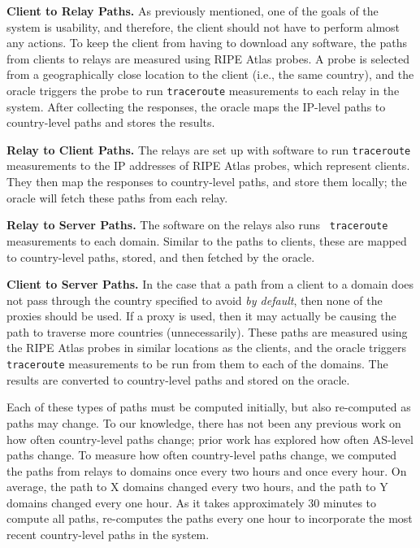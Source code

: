 {\bf Client to Relay Paths.} As previously mentioned, one of the goals of the 
system is usability, and therefore, the client should not have to perform 
almost any actions.  To keep the client from having to download any software, 
the paths from clients to relays are measured using RIPE Atlas probes.  A probe 
is selected from a geographically close location to the client (i.e., the same 
country), and the oracle triggers the probe to run {\tt traceroute} measurements 
to each relay in the system.  After collecting the responses, the oracle maps 
the IP-level paths to country-level paths and stores the results.

{\bf Relay to Client Paths.} The relays are set up with software to run 
{\tt traceroute} measurements to the IP addresses of RIPE Atlas probes, which 
represent clients.  They then map the responses to country-level paths, and 
store them locally; the oracle will fetch these paths from each relay. 

{\bf Relay to Server Paths.} The software on the relays also runs {\tt 
traceroute} measurements to each domain.  Similar to the paths to clients, these 
are mapped to country-level paths, stored, and then fetched by the oracle.

{\bf Client to Server Paths.} In the case that a path from a client to a 
domain does not pass through the country specified to avoid {\it by default}, 
then none of the proxies should be used.  If a proxy is used, then it may 
actually be causing the path to traverse more countries (unnecessarily).  These 
paths are measured using the RIPE Atlas probes in similar locations as the 
clients, and the oracle triggers {\tt traceroute} measurements to be run from 
them to each of the domains.  The results are converted to country-level paths 
and stored on the oracle.  

Each of these types of paths must be computed initially, but also re-computed 
as paths may change.  To our knowledge, there has not been any previous work 
on how often country-level paths change; prior work has explored how often 
AS-level paths change.  To measure how often country-level paths change, we 
computed the paths from relays to domains once every two hours and once every 
hour.  On average, the path to X domains changed every two hours, and the path 
to Y domains changed every one hour.  As it takes approximately 30 minutes to 
compute all paths, \system{} re-computes the paths every one hour to incorporate 
the most recent country-level paths in the system.

